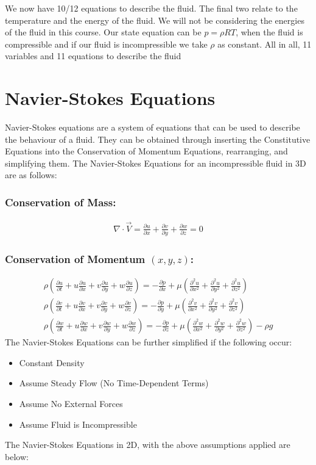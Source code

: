 \documentclass[class=report, crop=false, 12pt,a4paper]{standalone}
\begin{document}
We now have 10/12 equations to describe the fluid. The final two relate to the temperature and the energy of the fluid. We will not be considering the energies of the fluid in this course. Our state equation can be $p = \rho RT$, when the fluid is compressible and if our fluid is incompressible we take $\rho$ as constant. All in all, 11 variables and 11 equations to describe the fluid
\section{Navier-Stokes Equations}
Navier-Stokes equations are a system of equations that can be used to describe the behaviour of a fluid. They can be obtained through inserting the Constitutive Equations into the Conservation of Momentum Equations, rearranging, and simplifying them. The Navier-Stokes Equations for an incompressible fluid in 3D are as follows:
\subsubsection{Conservation of Mass:}
\begin{gather}
  \nabla \cdot \vec{V} = \frac{\partial u}{\partial x} + \frac{\partial v}{\partial y} + \frac{\partial w}{\partial z} = 0
\end{gather}
\subsubsection{Conservation of Momentum $(x,y,z)$:}
\begin{gather}
  \rho \left(\frac{\partial u}{\partial t} + u\frac{\partial u}{\partial x} + v\frac{\partial u}{\partial y} + w\frac{\partial u}{\partial z} \right) = -\frac{\partial p}{\partial x} + \mu \left(\frac{\partial^2 u}{\partial x^2} + \frac{\partial^2 u}{\partial y^2} + \frac{\partial^2 u}{\partial z^2} \right) \\
  \rho \left(\frac{\partial v}{\partial t} + u\frac{\partial v}{\partial x} + v\frac{\partial v}{\partial y} + w\frac{\partial v}{\partial z} \right) = -\frac{\partial p}{\partial y} + \mu \left(\frac{\partial^2 v}{\partial x^2} + \frac{\partial^2 v}{\partial y^2} + \frac{\partial^2 v}{\partial z^2} \right) \\
  \rho \left(\frac{\partial w}{\partial t} + u\frac{\partial w}{\partial x} + v\frac{\partial w}{\partial y} + w\frac{\partial w}{\partial z} \right) = -\frac{\partial p}{\partial z} + \mu \left(\frac{\partial^2 w}{\partial x^2} + \frac{\partial^2 w}{\partial y^2} + \frac{\partial^2 w}{\partial z^2} \right) - \rho g
\end{gather}
The Navier-Stokes Equations can be further simplified if the following occur:
\begin{itemize}
  \item Constant Density
  \item Assume Steady Flow (No Time-Dependent Terms)
  \item Assume No External Forces
  \item Assume Fluid is Incompressible
\end{itemize}
The Navier-Stokes Equations in 2D, with the above assumptions applied are below:
\end{document}
